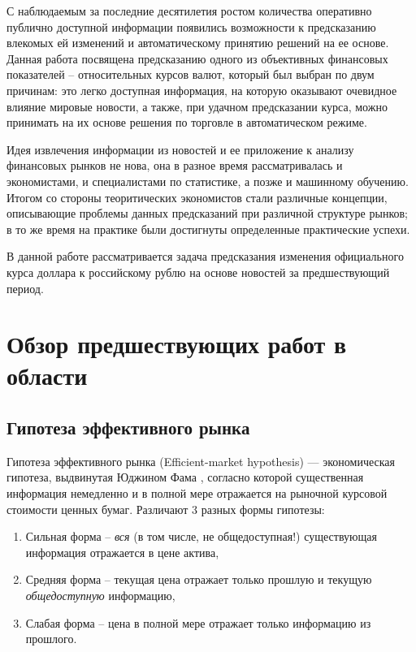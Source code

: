 \documentclass[pdftex,ptm,14pt,a4paper]{report}
\begin{document}
С наблюдаемым за последние десятилетия ростом количества оперативно публично доступной информации появились возможности к предсказанию влекомых ей изменений и автоматическому принятию решений на ее основе.
Данная работа посвящена предсказанию одного из объективных финансовых показателей -- относительных курсов валют, который был выбран по двум причинам: это легко доступная информация, на которую оказывают очевидное влияние мировые новости, а также, при удачном предсказании курса, можно принимать на их основе решения по торговле в автоматическом режиме.

Идея извлечения информации из новостей и ее приложение к анализу финансовых рынков не нова, она
в разное время рассматривалась и экономистами, и специалистами по статистике, а позже и машинному обучению.
Итогом со стороны теоритических экономистов стали различные концепции,
описывающие проблемы данных предсказаний при различной структуре рынков; в то же время на практике
были достигнуты определенные практические успехи.

В данной работе рассматривается задача предсказания изменения официального курса доллара к российскому рублю
на основе новостей за предшествующий период.

\tableofcontents

\chapter{Обзор предшествующих работ в области}

\iffalse

\section{Гипотеза эффективного рынка}

Гипотеза эффективного рынка (Efficient-market hypothesis) --- экономическая гипотеза, выдвинутая Юджином Фама \cite{EFH}, согласно которой существенная информация немедленно и в полной мере отражается на рыночной курсовой стоимости ценных бумаг. Различают 3 разных формы гипотезы:

\begin{enumerate}
\item Сильная форма -- \textit{вся} (в том числе, не общедоступная!) существующая информация отражается в цене актива,
\item Средняя форма -- текущая цена отражает только прошлую и текущую \textit{общедоступную} информацию,
\item Слабая форма -- цена в полной мере отражает только информацию из прошлого.
\end{enumerate}
\end{document}
